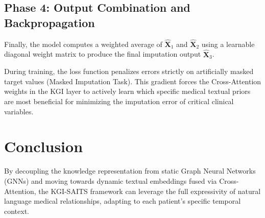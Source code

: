 \documentclass{article}
\begin{document}
\subsection{Phase 4: Output Combination and Backpropagation}
Finally, the model computes a weighted average of $\mathbf{\hat{X}}_1$ and $\mathbf{\hat{X}}_2$ using a learnable diagonal weight matrix to produce the final imputation output $\mathbf{\hat{X}}_3$. 

During training, the loss function penalizes errors strictly on artificially masked target values (Masked Imputation Task). This gradient forces the Cross-Attention weights in the KGI layer to actively learn which specific medical textual priors are most beneficial for minimizing the imputation error of critical clinical variables.

\section{Conclusion}
By decoupling the knowledge representation from static Graph Neural Networks (GNNs) and moving towards dynamic textual embeddings fused via Cross-Attention, the KGI-SAITS framework can leverage the full expressivity of natural language medical relationships, adapting to each patient's specific temporal context.
\end{document}
